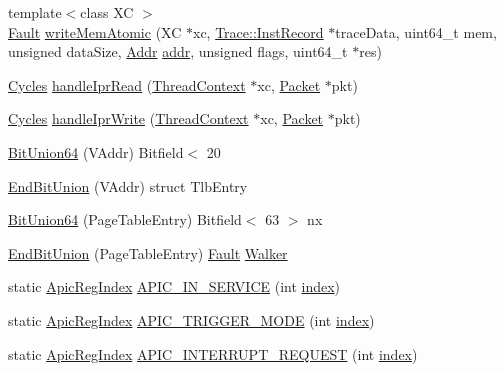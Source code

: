 \begin{DoxyCompactItemize}
\item 
{\footnotesize template$<$class XC $>$ }\\\hyperlink{classRefCountingPtr}{Fault} \hyperlink{namespaceX86ISA_a6a314d196cff35a2cc8043015e5dcc8b}{writeMemAtomic} (XC $\ast$xc, \hyperlink{classTrace_1_1InstRecord}{Trace::InstRecord} $\ast$traceData, uint64\_\-t mem, unsigned dataSize, \hyperlink{base_2types_8hh_af1bb03d6a4ee096394a6749f0a169232}{Addr} \hyperlink{namespaceX86ISA_ab705917f60c5566f9ce56a93f798b2e2}{addr}, unsigned flags, uint64\_\-t $\ast$res)
\item 
\hyperlink{classCycles}{Cycles} \hyperlink{namespaceX86ISA_a23dd7789afdb4f219d0c126238ef8052}{handleIprRead} (\hyperlink{classThreadContext}{ThreadContext} $\ast$xc, \hyperlink{classPacket}{Packet} $\ast$pkt)
\item 
\hyperlink{classCycles}{Cycles} \hyperlink{namespaceX86ISA_aa42813d6b9ccfb0d9d72d0a96d923106}{handleIprWrite} (\hyperlink{classThreadContext}{ThreadContext} $\ast$xc, \hyperlink{classPacket}{Packet} $\ast$pkt)
\item 
\hyperlink{namespaceX86ISA_afe8a46f6c035b6b4692b3b13071e48b4}{BitUnion64} (VAddr) Bitfield$<$ 20
\item 
\hyperlink{namespaceX86ISA_a0e90d862d83a06c8942fdd136b580e74}{EndBitUnion} (VAddr) struct TlbEntry
\item 
\hyperlink{namespaceX86ISA_ae28542c612a17a0204a7280bf2f19445}{BitUnion64} (PageTableEntry) Bitfield$<$ 63 $>$ nx
\item 
\hyperlink{namespaceX86ISA_a783dc6230f98af8cd46cce9be03e220c}{EndBitUnion} (PageTableEntry) \hyperlink{classRefCountingPtr}{Fault} \hyperlink{classX86ISA_1_1Walker}{Walker}
\item 
static \hyperlink{namespaceX86ISA_aaa839fcdf6f426c03c7382fcc29ac649}{ApicRegIndex} \hyperlink{namespaceX86ISA_a5c1e138a13b5dfdeed52ed0ebf585fe2}{APIC\_\-IN\_\-SERVICE} (int \hyperlink{namespaceX86ISA_aa7f971ede8ba06dbd8a605007eda1c6f}{index})
\item 
static \hyperlink{namespaceX86ISA_aaa839fcdf6f426c03c7382fcc29ac649}{ApicRegIndex} \hyperlink{namespaceX86ISA_afdf90895c5487dc266f742f30bb4a568}{APIC\_\-TRIGGER\_\-MODE} (int \hyperlink{namespaceX86ISA_aa7f971ede8ba06dbd8a605007eda1c6f}{index})
\item 
static \hyperlink{namespaceX86ISA_aaa839fcdf6f426c03c7382fcc29ac649}{ApicRegIndex} \hyperlink{namespaceX86ISA_a3c8c801a8304b85b8c6ae6ca3ac00f74}{APIC\_\-INTERRUPT\_\-REQUEST} (int \hyperlink{namespaceX86ISA_aa7f971ede8ba06dbd8a605007eda1c6f}{index})

\end{DoxyCompactItemize}
